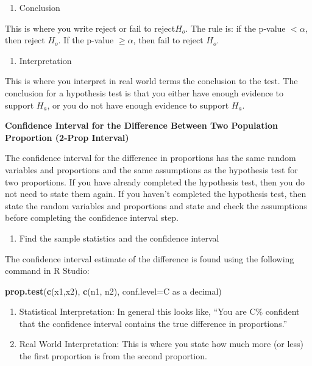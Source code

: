 \documentclass[
]{book}
\newenvironment{Shaded}{\begin{snugshade}}{\end{snugshade}}
\newcommand{\DataTypeTok}[1]{\textcolor[rgb]{0.13,0.29,0.53}{#1}}
\newcommand{\KeywordTok}[1]{\textcolor[rgb]{0.13,0.29,0.53}{\textbf{#1}}}
\newcommand{\NormalTok}[1]{#1}
\providecommand{\tightlist}{%
  \setlength{\itemsep}{0pt}\setlength{\parskip}{0pt}}
\begin{document}
\begin{enumerate}
\def\labelenumi{\arabic{enumi}.}
\setcounter{enumi}{4}
\tightlist
\item
  Conclusion
\end{enumerate}

This is where you write reject or fail to reject\(H_o\). The rule is: if the p-value \(<\alpha\), then reject \(H_o\). If the p-value \(\ge \alpha\), then fail to reject \(H_o\).

\begin{enumerate}
\def\labelenumi{\arabic{enumi}.}
\setcounter{enumi}{5}
\tightlist
\item
  Interpretation
\end{enumerate}

This is where you interpret in real world terms the conclusion to the test. The conclusion for a hypothesis test is that you either have enough evidence to support \(H_a\), or you do not have enough evidence to support \(H_a\).

\textbf{Confidence Interval for the Difference Between Two Population Proportion (2-Prop Interval)}

The confidence interval for the difference in proportions has the same random variables and proportions and the same assumptions as the hypothesis test for two proportions. If you have already completed the hypothesis test, then you do not need to state them again. If you haven't completed the hypothesis test, then state the random variables and proportions and state and check the assumptions before completing the confidence interval step.

\begin{enumerate}
\def\labelenumi{\arabic{enumi}.}
\tightlist
\item
  Find the sample statistics and the confidence interval
\end{enumerate}

The confidence interval estimate of the difference is found using the following command in R Studio:

\begin{Shaded}
\begin{Highlighting}[]
\KeywordTok{prop.test}\NormalTok{(}\KeywordTok{c}\NormalTok{(x1,x2), }\KeywordTok{c}\NormalTok{(n1, n2), }\DataTypeTok{conf.level=}\NormalTok{C as a decimal)}
\end{Highlighting}
\end{Shaded}

\begin{enumerate}
\def\labelenumi{\arabic{enumi}.}
\setcounter{enumi}{1}
\item
  Statistical Interpretation: In general this looks like, ``You are C\% confident that the confidence interval contains the true difference in proportions.''
\item
  Real World Interpretation: This is where you state how much more (or less) the first proportion is from the second proportion.
\end{enumerate}
\end{document}
